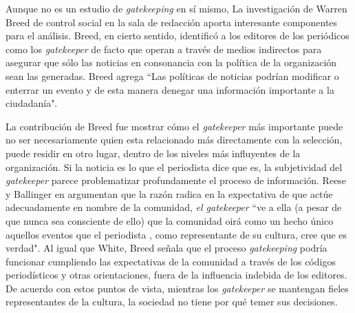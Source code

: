 Aunque no es un estudio de \emph{gatekeeping} en sí mismo, La investigación de Warren Breed de control social en la sala de redacción \cite{breed1955social} aporta interesante componentes para el análisis. Breed, en cierto sentido, identificó a los editores de los periódicos como los \emph{gatekeeper} de facto que operan a través de medios indirectos para asegurar que sólo las noticias en consonancia con la política de la organización sean las generadas. Breed agrega ``Las políticas de noticias podrían modificar o enterrar un evento y de esta manera denegar una información importante a la ciudadanía".


La contribución de Breed fue mostrar cómo el \emph{gatekeeper} más importante puede no ser necesariamente quien esta relacionado más directamente con la selección, puede residir en otro lugar, dentro de los niveles más influyentes de la organización. Si la noticia es lo que el periodista dice que es, la subjetividad del \emph{gatekeeper} parece problematizar profundamente el proceso de información. Reese y Ballinger en \cite{13213947} argumentan que la razón radica en la expectativa de que actúe adecuadamente en nombre de la comunidad, \emph{el gatekeeper} ``ve a ella (a pesar de que nunca sea consciente de ello) que la comunidad oirá como un hecho único aquellos eventos que el periodista , como representante de su cultura, cree que es verdad". Al igual que White, Breed señala que el proceso \emph{gatekeeping} podría funcionar cumpliendo las expectativas de la comunidad a través de los códigos periodísticos y otras orientaciones, fuera de la influencia indebida de los editores. De acuerdo con estos puntos de vista, mientras los \emph{gatekeeper} se mantengan fieles representantes de la cultura, la sociedad no tiene por qué temer sus decisiones.

